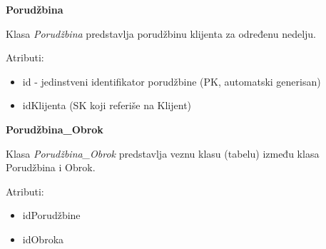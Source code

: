 \textbf{\large Porudžbina}
\vspace{0.3cm}

Klasa \textit{Porudžbina} predstavlja porudžbinu klijenta za određenu nedelju.

Atributi:
\begin{itemize}
    \item id - jedinstveni identifikator porudžbine (PK, automatski generisan)
    \item idKlijenta (SK koji referiše na Klijent)
\end{itemize}

\textbf{\large Porudžbina\_Obrok}
\vspace{0.3cm}

Klasa \textit{Porudžbina\_Obrok} predstavlja veznu klasu (tabelu) između klasa Porudžbina i Obrok.

Atributi:
\begin{itemize}
    \item idPorudžbine
    \item idObroka
\end{itemize}
